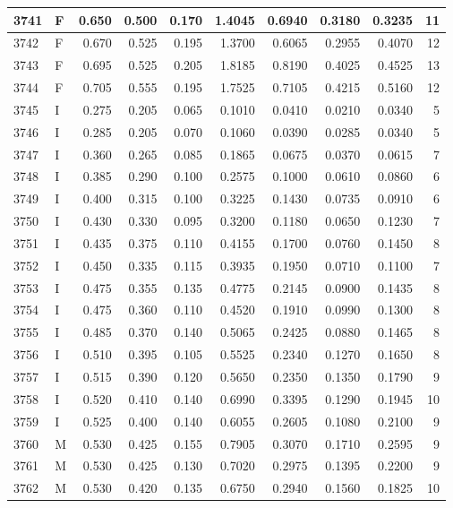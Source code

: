 \documentclass[9pt,twocolumn,twoside,]{pnas-new}
\begin{document}
\begin{tabular}{l|l|r|r|r|r|r|r|r|r}
\hline
3741 & F & 0.650 & 0.500 & 0.170 & 1.4045 & 0.6940 & 0.3180 & 0.3235 & 11\\
\hline
3742 & F & 0.670 & 0.525 & 0.195 & 1.3700 & 0.6065 & 0.2955 & 0.4070 & 12\\
\hline
3743 & F & 0.695 & 0.525 & 0.205 & 1.8185 & 0.8190 & 0.4025 & 0.4525 & 13\\
\hline
3744 & F & 0.705 & 0.555 & 0.195 & 1.7525 & 0.7105 & 0.4215 & 0.5160 & 12\\
\hline
3745 & I & 0.275 & 0.205 & 0.065 & 0.1010 & 0.0410 & 0.0210 & 0.0340 & 5\\
\hline
3746 & I & 0.285 & 0.205 & 0.070 & 0.1060 & 0.0390 & 0.0285 & 0.0340 & 5\\
\hline
3747 & I & 0.360 & 0.265 & 0.085 & 0.1865 & 0.0675 & 0.0370 & 0.0615 & 7\\
\hline
3748 & I & 0.385 & 0.290 & 0.100 & 0.2575 & 0.1000 & 0.0610 & 0.0860 & 6\\
\hline
3749 & I & 0.400 & 0.315 & 0.100 & 0.3225 & 0.1430 & 0.0735 & 0.0910 & 6\\
\hline
3750 & I & 0.430 & 0.330 & 0.095 & 0.3200 & 0.1180 & 0.0650 & 0.1230 & 7\\
\hline
3751 & I & 0.435 & 0.375 & 0.110 & 0.4155 & 0.1700 & 0.0760 & 0.1450 & 8\\
\hline
3752 & I & 0.450 & 0.335 & 0.115 & 0.3935 & 0.1950 & 0.0710 & 0.1100 & 7\\
\hline
3753 & I & 0.475 & 0.355 & 0.135 & 0.4775 & 0.2145 & 0.0900 & 0.1435 & 8\\
\hline
3754 & I & 0.475 & 0.360 & 0.110 & 0.4520 & 0.1910 & 0.0990 & 0.1300 & 8\\
\hline
3755 & I & 0.485 & 0.370 & 0.140 & 0.5065 & 0.2425 & 0.0880 & 0.1465 & 8\\
\hline
3756 & I & 0.510 & 0.395 & 0.105 & 0.5525 & 0.2340 & 0.1270 & 0.1650 & 8\\
\hline
3757 & I & 0.515 & 0.390 & 0.120 & 0.5650 & 0.2350 & 0.1350 & 0.1790 & 9\\
\hline
3758 & I & 0.520 & 0.410 & 0.140 & 0.6990 & 0.3395 & 0.1290 & 0.1945 & 10\\
\hline
3759 & I & 0.525 & 0.400 & 0.140 & 0.6055 & 0.2605 & 0.1080 & 0.2100 & 9\\
\hline
3760 & M & 0.530 & 0.425 & 0.155 & 0.7905 & 0.3070 & 0.1710 & 0.2595 & 9\\
\hline
3761 & M & 0.530 & 0.425 & 0.130 & 0.7020 & 0.2975 & 0.1395 & 0.2200 & 9\\
\hline
3762 & M & 0.530 & 0.420 & 0.135 & 0.6750 & 0.2940 & 0.1560 & 0.1825 & 10\\

\end{tabular}
\end{document}
